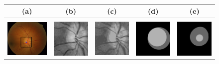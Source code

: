 \begin{figure}[t]

    \centering
	\renewcommand{\arraystretch}{0.8}
    
    \begin{tabular}{|c c c c c|}
    	
		\hline

		(a) & (b) & (c) & (d) & (e) \\
		
		\hline
		{} & {} & {} & {} & {} \\
		
		\includegraphics[width=3.5cm]{Images/Results/Segmentation/drishti101/od_detect.jpg} &
		\includegraphics[width=3cm]{Images/Results/Segmentation/drishti101/0_crop.png} &
		\includegraphics[width=3cm]{Images/Results/Segmentation/drishti101/1_kmeans.png} &
		\includegraphics[width=3cm]{Images/Results/Segmentation/drishti101/overlay.png} &
		\includegraphics[width=3cm]{Images/Results/Segmentation/drishti101/overlay_gt.png} \\
		

\end{tabular}
\end{figure}
